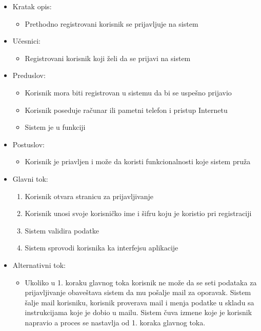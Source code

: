 \documentclass[a4paper]{article}
\begin{document}
\begin{itemize}
    \item Kratak opis:
        \begin{itemize}
            \item Prethodno registrovani korisnik se prijavljuje na sistem
        \end{itemize}
    \item Učesnici:
        \begin{itemize}
            \item Registrovani korisnik koji želi da se prijavi na sistem
        \end{itemize}
    \item Preduslov:
        \begin{itemize}
            \item Korisnik mora biti registrovan u sistemu da bi se uspešno prijavio
            \item Korisnik poseduje računar ili pametni telefon i pristup Internetu
            \item Sistem je u funkciji
        \end{itemize}
    \item Postuslov:
        \begin{itemize}
            \item Korisnik je priavljen i može da koristi funkcionalnosti koje sistem pruža
        \end{itemize}
    \item Glavni tok:
        \begin{enumerate}
            \item Korisnik otvara stranicu za prijavljivanje
            \item Korisnik unosi svoje korisničko ime i šifru koju je koristio pri registraciji
            \item Sistem validira podatke
            \item Sistem sprovodi korisnika ka interfejsu aplikacije
        \end{enumerate}
    \item Alternativni tok:
        \begin{itemize}
            \item Ukoliko u 1. koraku glavnog toka korisnik ne može da se seti podataka za prijavljivanje obaveštava sistem da mu pošalje mail za oporavak. Sistem šalje mail korisniku, korisnik proverava mail i menja podatke u skladu sa instrukcijama koje je dobio u mailu. Sistem čuva izmene koje je korisnik napravio a proces se nastavlja od 1. koraka glavnog toka.

\end{itemize}
\end{itemize}
\end{document}
